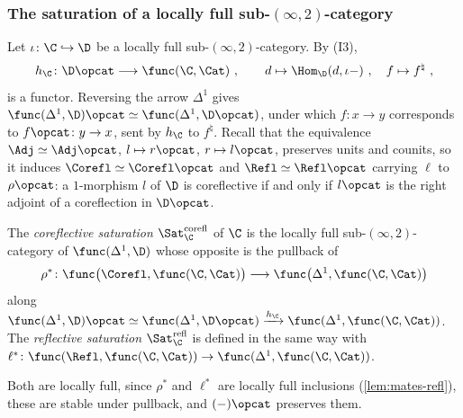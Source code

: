 \subsubsection*{The saturation of a locally full sub-$(\infty,2)$-category}

Let $\iota\colon \C \hookrightarrow \D$ be a locally full sub-$(\infty,2)$-category. By (I3),
\[
h_{\C}\colon \D\opcat \longrightarrow \func(\C,\Cat) \ , \qquad d \mapsto \Hom_{\D}(d,\iota-) \ , \quad f \mapsto f^{\natural} \ ,
\]
is a functor. Reversing the arrow $\Delta^{1}$ gives $\func(\Delta^{1},\D)\opcat \simeq \func(\Delta^{1},\D\opcat)$, under which $f\colon x \to y$ corresponds to $f\opcat\colon y \to x$, sent by $h_{\C}$ to $f^{\natural}$.
Recall that the equivalence $\Adj \simeq \Adj\opcat$, $l \mapsto r\opcat$, $r \mapsto l\opcat$, preserves units and counits, so it induces $\Corefl \simeq \Corefl\opcat$ and $\Refl \simeq \Refl\opcat$ carrying $\ell$ to $\rho\opcat$: a $1$-morphism $l$ of $\D$ is coreflective if and only if $l\opcat$ is the right adjoint of a coreflection in $\D\opcat$.

\begin{defi}
\label{def:saturation-C}
The \emph{coreflective saturation} $\Sat^{\mathrm{corefl}}_{\C}$ of $\C$ is the locally full sub-$(\infty,2)$-category of $\func(\Delta^{1},\D)$ whose opposite is the pullback of
\[
\rho^{*}\colon \func\bigl(\Corefl,\func(\C,\Cat)\bigr) \longrightarrow \func\bigl(\Delta^{1},\func(\C,\Cat)\bigr)
\]
along $\func(\Delta^{1},\D)\opcat \simeq \func(\Delta^{1},\D\opcat) \xrightarrow{h_{\C}} \func(\Delta^{1},\func(\C,\Cat))$. The \emph{reflective saturation} $\Sat^{\mathrm{refl}}_{\C}$ is defined in the same way with $\ell^{*}\colon \func(\Refl,\func(\C,\Cat)) \to \func(\Delta^{1},\func(\C,\Cat))$.
\end{defi}

Both are locally full, since $\rho^{*}$ and $\ell^{*}$ are locally full inclusions (\cref{lem:mates-refl}), these are stable under pullback, and $(-)\opcat$ preserves them.

